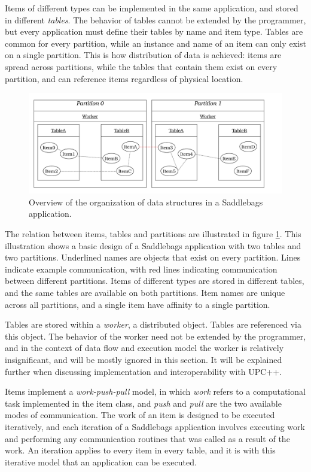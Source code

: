 \documentclass{uit-report}
\begin{document}
Items of different types can be implemented in the same application, and stored in different \emph{tables}. The behavior of tables cannot be extended by the programmer, but every application must define their tables by name and item type. Tables are common for every partition, while an instance and name of an item can only exist on a single partition. This is how distribution of data is achieved: items are spread across partitions, while the tables that contain them exist on every partition, and can reference items regardless of physical location.

\begin{figure}[h]
\centering
\includegraphics[width=16cm]{illustrations/basicmodel.pdf}
\caption{Overview of the organization of data structures in a Saddlebags application.}
\label{fig:basicmodel}
\end{figure}

The relation between items, tables and partitions are illustrated in figure \ref{fig:basicmodel}. This illustration shows a basic design of a Saddlebags application with two tables and two partitions. Underlined names are objects that exist on every partition. Lines indicate example communication, with red lines indicating communication between different partitions. Items of different types are stored in different tables, and the same tables are available on both partitions. Item names are unique across all partitions, and a single item have affinity to a single partition. 

Tables are stored within a \emph{worker}, a distributed object. Tables are referenced via this object. The behavior of the worker need not be extended by the programmer, and in the context of data flow and execution model the worker is relatively insignificant, and will be mostly ignored in this section. It will be explained further when discussing implementation and interoperability with UPC++.

Items implement a \emph{work-push-pull} model, in which \emph{work} refers to a computational task implemented in the item class, and \emph{push} and \emph{pull} are the two available modes of communication. The work of an item is designed to be executed iteratively, and each iteration of a Saddlebags application involves executing work and performing any communication routines that was called as a result of the work. An iteration applies to every item in every table, and it is with this iterative model that an application can be executed. 
\end{document}
